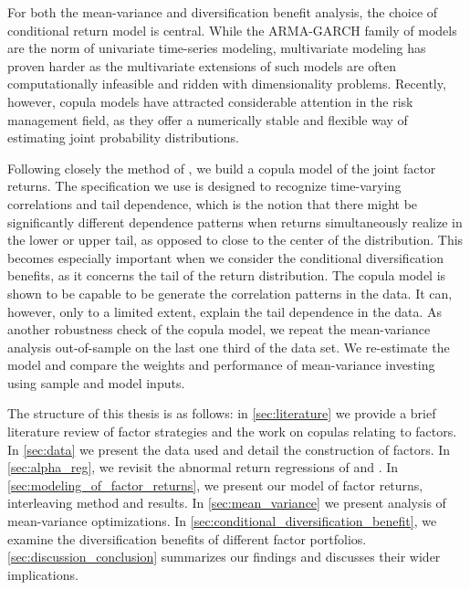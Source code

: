 For both the mean-variance and diversification benefit analysis, the choice of conditional return model is central. While the ARMA-GARCH family of models are the norm of univariate time-series modeling, multivariate modeling has proven harder as the multivariate extensions of such models are often computationally infeasible and ridden with dimensionality problems. Recently, however, copula models have attracted considerable attention in the risk management field, as they offer a numerically stable and flexible way of estimating joint probability distributions. 

Following closely the method of \textcite{ChristoffersenLanglois2013}, we build a copula model of the joint factor returns. The specification we use is designed to recognize time-varying correlations and tail dependence, which is the notion that there might be significantly different dependence patterns when returns simultaneously realize in the lower or upper tail, as opposed to close to the center of the distribution. This becomes especially important when we consider the conditional diversification benefits, as it concerns the tail of the return distribution. The copula model is shown to be capable to be generate the correlation patterns in the data. It can, however, only to a limited extent, explain the tail dependence in the data. As another robustness check of the copula model, we repeat the mean-variance analysis out-of-sample on the last one third of the data set. We re-estimate the model and compare the weights and performance of mean-variance investing using sample and model inputs.
 
The structure of this thesis is as follows: in \autoref{sec:literature} we provide a brief literature review of factor strategies and the work on copulas relating to factors. In \autoref{sec:data} we present the data used and detail the construction of factors. In \autoref{sec:alpha_reg}, we revisit the abnormal return regressions of \textcite{FF2015} and \textcite{Asness2015}. In \autoref{sec:modeling_of_factor_returns}, we present our model of factor returns, interleaving method and results. In \autoref{sec:mean_variance} we present analysis of mean-variance optimizations. In \autoref{sec:conditional_diversification_benefit}, we examine the diversification benefits of different factor portfolios. \autoref{sec:discussion_conclusion} summarizes our findings and discusses their wider implications.
